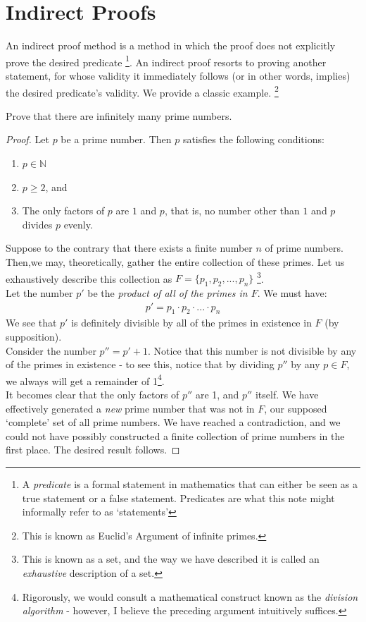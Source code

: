 \documentclass[../proofs.tex]{subfiles}
\begin{document}
\chapter{Indirect Proofs}
An indirect proof method is a method in which the proof does not explicitly prove the desired predicate \footnote{A \emph{predicate} is a formal statement in mathematics that can either be seen as a true statement or a false statement. Predicates are what this note might informally refer to as `statements'}. An indirect proof resorts to proving another statement, for whose validity it immediately follows (or in other words, implies) the desired predicate's validity. We provide a classic example. \footnote{This is known as Euclid's Argument of infinite primes.} \\

\begin{expl}{Prove that there are infinitely many prime numbers.}
\begin{proof}
  Let $p$ be a prime number. Then $p$ satisfies the following conditions:
    \begin{enumerate}
      \item $p \in \mathbb{N}$
      \item $p \geq 2$, and
      \item The only factors of $p$ are $1$ and $p$, that is, no number other than $1$ and $p$ divides $p$ evenly.
    \end{enumerate}
  Suppose to the contrary that there exists a finite number $n$ of prime numbers. \\
  Then,we may, theoretically, gather the entire collection of these primes. Let us exhaustively describe this collection as $F = \{p_1, p_2, ..., p_n\}$ \footnote{This is known as a set, and the way we have described it is called an \emph{exhaustive} description of a set.}. \\
  Let the number $p\prime$ be the \emph{product of all of the primes in $F$}. We must have:
  \begin{align*}
    p\prime = p_1 \cdot p_2 \cdot ... \cdot p_n
  \end{align*}
  We see that $p'$ is definitely divisible by all of the primes in existence in $F$ (by supposition). \\
  Consider the number $p \dprime = p \prime + 1$. Notice that this number is not divisible by any of the primes in existence - to see this, notice that by dividing $p \dprime $ by any $p \in F$, we always will get a remainder of 1\footnote{Rigorously, we would consult a mathematical construct known as the \emph{division algorithm} - however, I believe the preceding argument intuitively suffices.}.\\

  It becomes clear that the only factors of $p \dprime$ are 1, and $p \dprime$ itself. We have effectively generated a \emph{new} prime number that was not in $F$, our supposed `complete' set of all prime numbers. We have reached a contradiction, and we could not have possibly constructed a finite collection of prime numbers in the first place. The desired result follows.
  \end{proof}
\end{expl}
\end{document}

